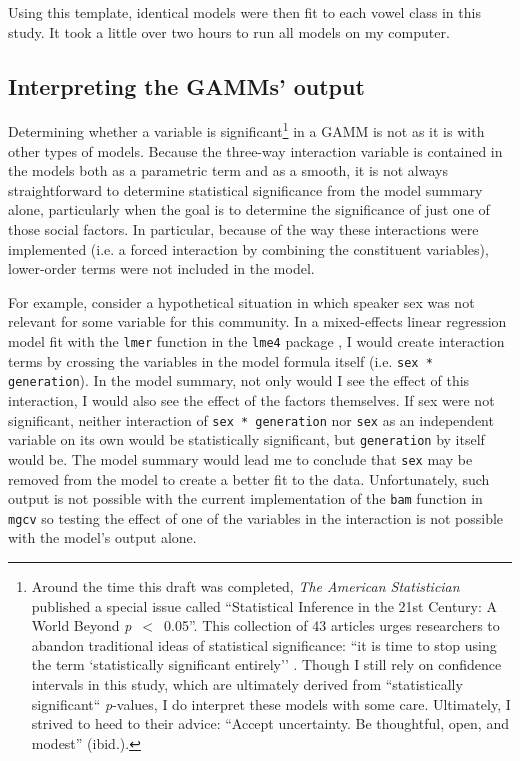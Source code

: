 Using this template, identical models were then fit to each vowel class in this study. It took a little over two hours to run all models on my computer.

\subsection{Interpreting the GAMMs' output}
\label{sec:interpretation_of_gamms}

Determining whether a variable is significant\footnote{Around the time this draft was completed, \textit{The American Statistician} published a special issue called ``Statistical Inference in the 21st Century: A World Beyond \textit{p}~$<$~0.05''. This collection of 43 articles urges researchers to abandon traditional ideas of statistical significance: ``it is time to stop using the term `statistically significant entirely'' \citep[2]{wasserstein_etal_2019}. Though I still rely on confidence intervals in this study, which are ultimately derived from ``statistically significant`` \textit{p}-values, I do interpret these models with some care. Ultimately, I strived to heed to their advice: ``Accept uncertainty. Be thoughtful, open, and modest'' (ibid.).} in a GAMM is not as it is with other types of models. Because the three-way interaction variable is contained in the models both as a parametric term and as a smooth, it is not always straightforward to determine statistical significance from the model summary alone, particularly when the goal is to determine the significance of just one of those social factors. In particular, because of the way these interactions were implemented (i.e. a forced interaction by combining the constituent variables), lower-order terms were not included in the model.

For example, consider a hypothetical situation in which speaker sex was not relevant for some variable for this community. In a mixed-effects linear regression model fit with the \texttt{lmer} function in the \texttt{lme4} package \citep{bates_etal_2015_lme4}, I would create interaction terms by crossing the variables in the model formula itself (i.e. \texttt{sex * generation}). In the model summary, not only would I see the effect of this interaction, I would also see the effect of the factors themselves. If sex were not significant, neither interaction of \texttt{sex * generation} nor \texttt{sex} as an independent variable on its own would be statistically significant, but \texttt{generation} by itself would be. The model summary would lead me to conclude that \texttt{sex} may be removed from the model to create a better fit to the data. Unfortunately, such output is not possible with the current implementation of the \texttt{bam} function in \texttt{mgcv} \citep{wood_2017} so testing the effect of one of the variables in the interaction is not possible with the model's output alone.

